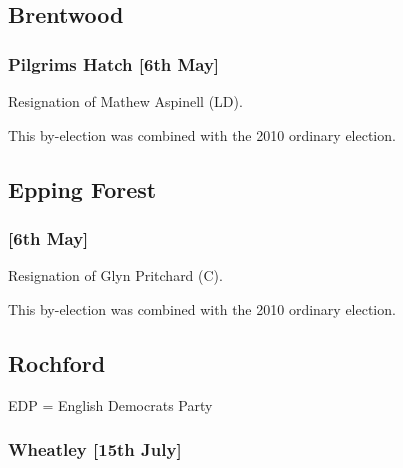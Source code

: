 \begin{resultsiii}
\subsection{Brentwood}

\subsubsection*{Pilgrims Hatch \hspace*{\fill}\nolinebreak[1]%
\enspace\hspace*{\fill}
[6th May]}


Resignation of Mathew Aspinell (LD).

This by-election was combined with the 2010 ordinary election.

\subsection{Epping Forest}

\subsubsection*{ \hspace*{\fill}\nolinebreak[1]%
\enspace\hspace*{\fill}
[6th May]}


Resignation of Glyn Pritchard (C).

This by-election was combined with the 2010 ordinary election.

\subsection{Rochford}

EDP = English Democrats Party

\subsubsection*{Wheatley \hspace*{\fill}\nolinebreak[1]%
\enspace\hspace*{\fill}
[15th July]}


\end{resultsiii}
